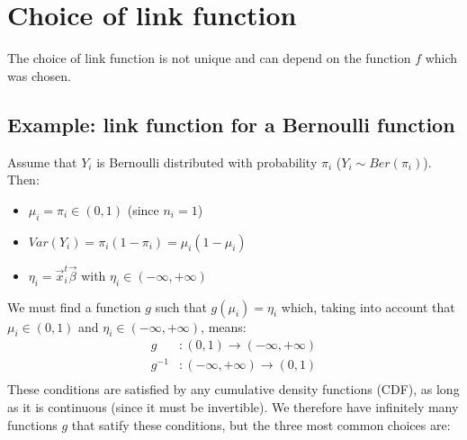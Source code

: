   \section{Choice of link function}
    The choice of link function is not unique and can depend on the function $f$ which was chosen.

    \subsection{Example: link function for a Bernoulli function}
      Assume that $Y_i$ is Bernoulli distributed with probability $\pi_i$ ($Y_i \sim Ber(\pi_i)$). Then:
      \begin{itemize}
        \item $\mu_i = \pi_i \in (0,1)$ (since $n_i = 1$)
        \item $Var(Y_i) = \pi_i(1-\pi_i) = \mu_i(1-\mu_i)$
        \item $\eta_i = \vec{x}_i^t\vec{\beta}$ with $\eta_i \in (-\infty, +\infty)$
      \end{itemize}
      We must find a function $g$ such that $g(\mu_i)=\eta_i$ which, taking into account that $\mu_i \in (0, 1)$ and $\eta_i \in (-\infty, +\infty)$, means:
      \begin{align*}
        g&: (0, 1) \to (-\infty, +\infty) \\
        g^{-1}&: (-\infty, +\infty) \to (0, 1)  \\
      \end{align*}
      These conditions are satisfied by any cumulative density functions (CDF), as long as it is continuous (since it must be invertible).
      We therefore have infinitely many functions $g$ that satify these conditions, but the three most common choices are:
